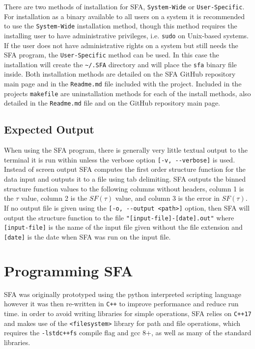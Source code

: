 \documentclass[12pt, oneside]{smuthesis}
\begin{document}
There are two methods of installation for SFA, \verb|System-Wide| or \verb|User-Specific|. For installation as a binary available to all users on a system it is recommended to use the \verb|System-Wide| installation method, though this method requires the installing user to have administrative privileges, i.e. \verb|sudo| on Unix-based systems. If the user does not have administrative rights on a system but still needs the SFA program, the \verb|User-Specific| method can be used. In this case the installation will create the \verb|~/.SFA| directory and will place the \verb|sfa| binary file inside. Both installation methods are detailed on the SFA GitHub repository main page and in the \verb|Readme.md| file included with the project. Included in the projects \verb|makefile| are uninstallation methods for each of the install methods, also detailed in the \verb|Readme.md| file and on the GitHub repository main page.

\subsection{\sc Expected Output} \label{expectedOutput}

When using the SFA program, there is generally very little textual output to the terminal it is run within unless the verbose option \verb|[-v, --verbose]| is used. Instead of screen output SFA computes the first order structure function for the data input and outputs it to a file using tab delimiting. SFA outputs the binned structure function values to the following columns without headers, column 1 is the $\tau$ value, column 2 is the $SF(\tau)$ value, and column 3 is the error in $SF(\tau)$. If no output file is given using the \verb|[-o, --output <path>]| option, then SFA will output the structure function to the file \verb|"[input-file]-[date].out"| where \verb|[input-file]| is the name of the input file given without the file extension and \verb|[date]| is the date when SFA was run on the input file.

\section{\sc Programming SFA} \label{programmingSFA}

 SFA was originally prototyped using the python interpreted scripting language however it was then re-written in \verb|C++| to improve performance and reduce run time. in order to avoid writing libraries for simple operations, SFA relies on \verb|C++17| and makes use of the \verb|<filesystem>| library for path and file operations, which requires the \verb|-lstdc++fs| compile flag and gcc 8+, as well as many of the standard libraries.
\end{document}
